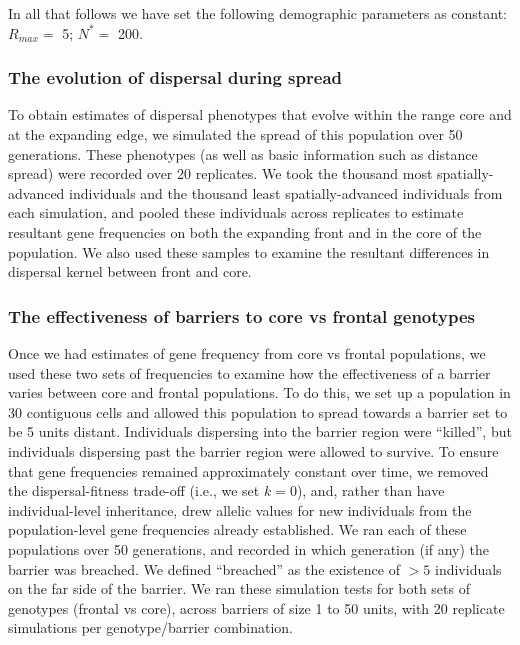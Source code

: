 \documentclass{article}
\begin{document}
In all that follows we have set the following demographic parameters as
constant: \(R_{max}=\) 5; \(N^*=\) 200.

\subsubsection{The evolution of dispersal during
spread}

To obtain estimates of dispersal phenotypes that evolve within the range
core and at the expanding edge, we simulated the spread of this
population over 50 generations. These phenotypes (as well as basic
information such as distance spread) were recorded over 20 replicates.
We took the thousand most spatially-advanced individuals and the
thousand least spatially-advanced individuals from each simulation, and
pooled these individuals across replicates to estimate resultant gene
frequencies on both the expanding front and in the core of the
population. We also used these samples to examine the resultant
differences in dispersal kernel between front and core.

\subsubsection{The effectiveness of barriers to core vs frontal
genotypes}

Once we had estimates of gene frequency from core vs frontal
populations, we used these two sets of frequencies to examine how the
effectiveness of a barrier varies between core and frontal populations.
To do this, we set up a population in 30 contiguous cells and allowed this population to spread towards a barrier set to be 5 units distant. Individuals dispersing into the barrier region were ``killed'', but individuals dispersing past the barrier region were allowed to survive. To ensure that gene frequencies remained approximately constant over time, we removed the dispersal-fitness trade-off (i.e., we set \(k=0\)), and, rather than have individual-level inheritance, drew allelic values for new individuals from the population-level gene frequencies already established. We ran each of these populations over 50 generations, and recorded in which generation (if any) the barrier was breached. We defined ``breached'' as the existence of \(>5\) individuals on the far side of the barrier. We ran these simulation tests for both sets of genotypes (frontal vs core), across barriers of size 1 to 50 units, with 20 replicate simulations per genotype/barrier combination.
\end{document}
